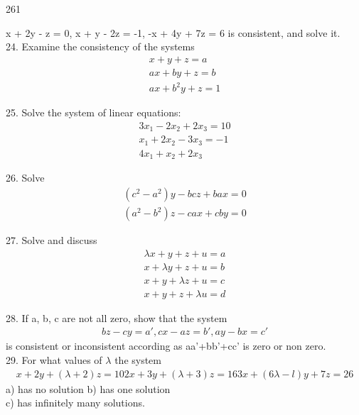 \documentclass{article}
\begin{document}
  
\begin{center} 261 \end{center}
  
  
  x + 2y - z = 0, x + y - 2z = -1, -x + 4y + 7z = 6
is consistent, and solve it. \\

24. Examine the consistency of the systems 
\begin{align*}
x + y + z = a \\
ax + by + z = b \\
ax + b^2y + z = 1 
\end{align*}
 
25. Solve the system of linear equations:
\begin{align*}
3x_{1} - 2x_{2} + 2x_{3} = 10 \\
x_{1} + 2x_{2} - 3x_{3} = -1 \\
4x_{1} + x_{2} + 2x_{3}
\end{align*}

26. Solve
\begin{align*}
(c^2 - a^2)y - bc z + ba x = 0 \\
(a^2 - b^2)z - ca x + cb y = 0
\end{align*}

27. Solve and discuss
\begin{align*}
\lambda x + y + z + u = a \\
x+ \lambda y + z + u = b \\
x + y + \lambda z + u = c \\
x + y + z + \lambda u = d
\end{align*}

28. If a, b, c are not all zero, show that the system 
\begin{align*}
bz - cy = {a}', cx - az = {b}', ay- bx = {c}'
\end{align*}
is consistent or inconsistent according as a{a}'+b{b}'+c{c}'
is zero or non zero. \\

29. For what values of $\lambda$ the system
\begin{align*}
x + 2y + (\lambda + 2)z = 10
2x + 3y + (\lambda + 3)z = 16
3x + (6\lambda-l)y + 7z = 26
\end{align*}
a) has no solution  b) has one solution \\
c) has infinitely many solutions.
\end{document}
